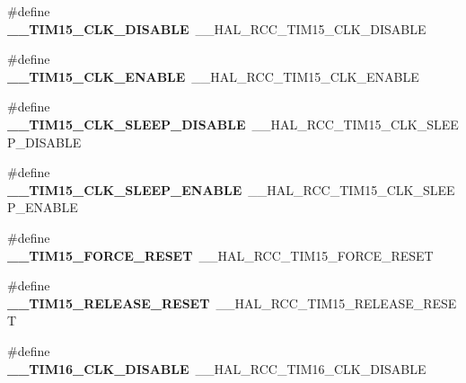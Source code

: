 \begin{DoxyCompactItemize}
\#define {\bfseries \+\_\+\+\_\+\+T\+I\+M15\+\_\+\+C\+L\+K\+\_\+\+D\+I\+S\+A\+B\+LE}~\+\_\+\+\_\+\+H\+A\+L\+\_\+\+R\+C\+C\+\_\+\+T\+I\+M15\+\_\+\+C\+L\+K\+\_\+\+D\+I\+S\+A\+B\+LE
\item 
\mbox{\label{group___h_a_l___r_c_c___aliased_ga26324fde431019435e70c6f9546a9116}} 
\#define {\bfseries \+\_\+\+\_\+\+T\+I\+M15\+\_\+\+C\+L\+K\+\_\+\+E\+N\+A\+B\+LE}~\+\_\+\+\_\+\+H\+A\+L\+\_\+\+R\+C\+C\+\_\+\+T\+I\+M15\+\_\+\+C\+L\+K\+\_\+\+E\+N\+A\+B\+LE
\item 
\mbox{\label{group___h_a_l___r_c_c___aliased_ga2edf101c47e6e927889d454f7c3e4c08}} 
\#define {\bfseries \+\_\+\+\_\+\+T\+I\+M15\+\_\+\+C\+L\+K\+\_\+\+S\+L\+E\+E\+P\+\_\+\+D\+I\+S\+A\+B\+LE}~\+\_\+\+\_\+\+H\+A\+L\+\_\+\+R\+C\+C\+\_\+\+T\+I\+M15\+\_\+\+C\+L\+K\+\_\+\+S\+L\+E\+E\+P\+\_\+\+D\+I\+S\+A\+B\+LE
\item 
\mbox{\label{group___h_a_l___r_c_c___aliased_ga9d37421bcf87efc7643928dfafabecf3}} 
\#define {\bfseries \+\_\+\+\_\+\+T\+I\+M15\+\_\+\+C\+L\+K\+\_\+\+S\+L\+E\+E\+P\+\_\+\+E\+N\+A\+B\+LE}~\+\_\+\+\_\+\+H\+A\+L\+\_\+\+R\+C\+C\+\_\+\+T\+I\+M15\+\_\+\+C\+L\+K\+\_\+\+S\+L\+E\+E\+P\+\_\+\+E\+N\+A\+B\+LE
\item 
\mbox{\label{group___h_a_l___r_c_c___aliased_ga03c43f6aa09a714c4d091331110a209a}} 
\#define {\bfseries \+\_\+\+\_\+\+T\+I\+M15\+\_\+\+F\+O\+R\+C\+E\+\_\+\+R\+E\+S\+ET}~\+\_\+\+\_\+\+H\+A\+L\+\_\+\+R\+C\+C\+\_\+\+T\+I\+M15\+\_\+\+F\+O\+R\+C\+E\+\_\+\+R\+E\+S\+ET
\item 
\mbox{\label{group___h_a_l___r_c_c___aliased_ga1b9c6bc76d9ee78a55710eb7773a2bbc}} 
\#define {\bfseries \+\_\+\+\_\+\+T\+I\+M15\+\_\+\+R\+E\+L\+E\+A\+S\+E\+\_\+\+R\+E\+S\+ET}~\+\_\+\+\_\+\+H\+A\+L\+\_\+\+R\+C\+C\+\_\+\+T\+I\+M15\+\_\+\+R\+E\+L\+E\+A\+S\+E\+\_\+\+R\+E\+S\+ET
\item 
\mbox{\label{group___h_a_l___r_c_c___aliased_ga20a13035ec7902e5ca5fdf878cb51ec3}} 
\#define {\bfseries \+\_\+\+\_\+\+T\+I\+M16\+\_\+\+C\+L\+K\+\_\+\+D\+I\+S\+A\+B\+LE}~\+\_\+\+\_\+\+H\+A\+L\+\_\+\+R\+C\+C\+\_\+\+T\+I\+M16\+\_\+\+C\+L\+K\+\_\+\+D\+I\+S\+A\+B\+LE
\item 

\end{DoxyCompactItemize}

